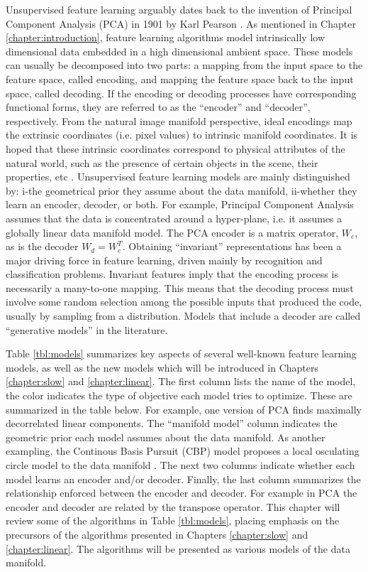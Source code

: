Unsupervised feature learning arguably dates back to the invention of Principal
Component Analysis (PCA) in 1901 by Karl Pearson \cite{PCA}. As mentioned in
Chapter \ref{chapter:introduction}, feature learning algorithms model
intrinsically low dimensional data embedded in a high dimensional ambient
space. These models can usually be decomposed into two parts: a mapping from
the input space to the feature space, called encoding, and mapping the feature
space back to the input space, called decoding. If the encoding or decoding
processes have corresponding functional forms, they are referred to as the
``encoder'' and ``decoder'', respectively.  From the natural image manifold
perspective, ideal encodings map the extrinsic coordinates (i.e. pixel values)
to intrinsic manifold coordinates. It is hoped that these intrinsic coordinates
correspond to physical attributes of the natural world, such as the presence of
certain objects in the scene, their properties, etc \cite{nair2008,capsules}.
Unsupervised feature learning models are mainly distinguished by: i-the
geometrical prior they assume about the data manifold, ii-whether they learn an
encoder, decoder, or both. For example, Principal Component Analysis assumes
that the data is concentrated around a hyper-plane, i.e. it assumes a globally
linear data manifold model. The PCA encoder is a matrix operator, $W_e$, as is
the decoder $W_d=W_e^T$.  Obtaining ``invariant'' representations has been a
major driving force in feature learning, driven mainly by recognition and
classification problems.  Invariant features imply that the encoding process is
necessarily a many-to-one mapping. This means that the decoding process must
involve some random selection among the possible inputs that produced the code,
usually  by sampling from a distribution. Models that include a decoder are
called ``generative models'' in the literature. 

Table \ref{tbl:models} summarizes key aspects of several well-known feature
learning models, as well as the new models which will be introduced in Chapters
\ref{chapter:slow} and \ref{chapter:linear}. The first column lists the name of
the model, the color indicates the type of objective each model tries to
optimize.  These are summarized in the table below. For example, one version of
PCA finds maximally decorrelated linear components. The ``manifold model''
column indicates the geometric prior each model assumes about the data
manifold. As another exampling,  the Continous Basis Pursuit (CBP) model
proposes a local osculating circle model to the data manifold \cite{CBP}.  The
next two columns indicate whether each model learns an encoder and/or decoder.
Finally, the last column summarizes the relationship enforced between the
encoder and decoder. For example in PCA the encoder and decoder are related by
the transpose operator. This chapter will review some of the algorithms in
Table \ref{tbl:models}, placing emphasis on the precursors of the algorithms
presented in Chapters \ref{chapter:slow} and \ref{chapter:linear}. The
algorithms will be presented as various models of the data manifold.

